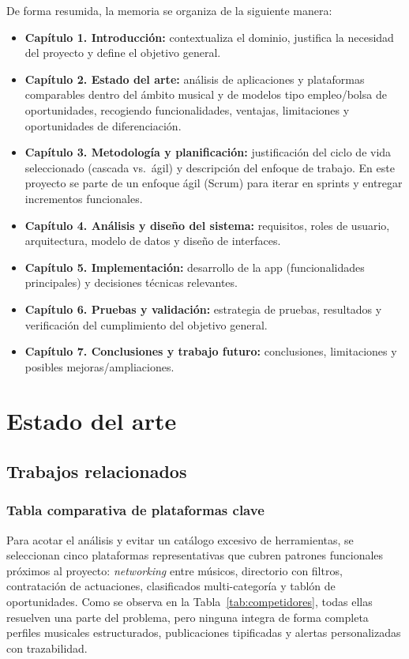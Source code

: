 \documentclass[12pt,a4paper]{report}
\begin{document}
De forma resumida, la memoria se organiza de la siguiente manera:
\begin{itemize}
  \item \textbf{Capítulo 1. Introducción:} contextualiza el dominio, justifica la necesidad del proyecto y define el objetivo general.
  \item \textbf{Capítulo 2. Estado del arte:} análisis de aplicaciones y plataformas comparables dentro del ámbito musical y de modelos tipo empleo/bolsa de oportunidades, recogiendo funcionalidades, ventajas, limitaciones y oportunidades de diferenciación.
  \item \textbf{Capítulo 3. Metodología y planificación:} justificación del ciclo de vida seleccionado (cascada vs.\ ágil) y descripción del enfoque de trabajo. En este proyecto se parte de un enfoque ágil (Scrum) para iterar en sprints y entregar incrementos funcionales.
  \item \textbf{Capítulo 4. Análisis y diseño del sistema:} requisitos, roles de usuario, arquitectura, modelo de datos y diseño de interfaces.
  \item \textbf{Capítulo 5. Implementación:} desarrollo de la app (funcionalidades principales) y decisiones técnicas relevantes.
  \item \textbf{Capítulo 6. Pruebas y validación:} estrategia de pruebas, resultados y verificación del cumplimiento del objetivo general.
  \item \textbf{Capítulo 7. Conclusiones y trabajo futuro:} conclusiones, limitaciones y posibles mejoras/ampliaciones.
\end{itemize}

\chapter{Estado del arte}

\section{Trabajos relacionados}

\subsection{Tabla comparativa de plataformas clave}
Para acotar el análisis y evitar un catálogo excesivo de herramientas, se seleccionan cinco plataformas representativas que cubren patrones funcionales próximos al proyecto: \textit{networking} entre músicos, directorio con filtros, contratación de actuaciones, clasificados multi-categoría y tablón de oportunidades. Como se observa en la Tabla~\ref{tab:competidores}, todas ellas resuelven una parte del problema, pero ninguna integra de forma completa perfiles musicales estructurados, publicaciones tipificadas y alertas personalizadas con trazabilidad.
\end{document}
